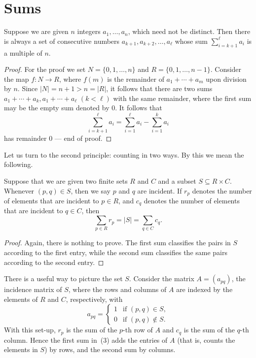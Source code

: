 \section{Sums}

\begin{theorem}[Claim]
  \label{ch28claim4}
  Suppose we are given $n$ integers $a_1, \dots, a_n$, which need not be distinct.
  Then there is always a set of consecutive numbers $a_{k+1}, a_{k+2}, \dots, a_{\ell}$
  whose sum $\sum_{i=k+1}^{\ell} a_i$ is a multiple of $n$.
\end{theorem}
\begin{proof}
  \leanok
  For the proof we set $N = \{0, 1, \dots, n\}$ and $R = \{0, 1, \dots, n-1\}$.
  Consider the map $f : N \to R$, where $f(m)$ is the remainder of $a_1 + \cdots + a_m$
  upon division by $n$. Since $|N| = n+1 > n = |R|$,
  it follows that there are two sums $a_1 + \cdots + a_k, a_1 + \cdots + a_{\ell}$ $(k < \ell)$
  with the same remainder, where the first sum may be the empty sum denoted by $0$. It follows that
  \[
  \sum_{i=k+1}^{\ell} a_i = \sum_{i=1}^{\ell} a_i - \sum_{i=1}^{k} a_i
  \]
  has remainder $0$ --- end of proof.
\end{proof}

\bigskip

Let us turn to the second principle: counting in two ways. By this we mean
the following.

\begin{theorem}
  \label{double_counting}
  Suppose that we are given two finite sets $R$ and $C$ and a subset $S \subseteq R \times C$.
  Whenever $(p, q) \in S$, then we say $p$ and $q$ are incident.
  If $r_p$ denotes the number of elements that are incident to $p \in R$, and $c_q$
  denotes the number of elements that are incident to $q \in C$, then
  \[
  \sum_{p \in R} r_p = |S| = \sum_{q \in C} c_q. \tag{3}
  \]
\end{theorem}
\begin{proof}
  \leanok
  Again, there is nothing to prove. The first sum classifies the pairs in $S$
  according to the first entry, while the second sum classifies the same pairs
  according to the second entry.
\end{proof}

There is a useful way to picture the set $S$. Consider the matrix $A = (a_{pq})$,
the incidence matrix of $S$, where the rows and columns of $A$ are indexed
by the elements of $R$ and $C$, respectively, with
\[
a_{pq} = \begin{cases} 1 & \text{if } (p, q) \in S, \\ 0 & \text{if } (p, q) \notin S. \end{cases}
\]
With this set-up, $r_p$ is the sum of the $p$-th row of $A$ and $c_q$ is the sum of the
$q$-th column. Hence the first sum in~(3) adds the entries of $A$ (that is, counts
the elements in $S$) by rows, and the second sum by columns.

